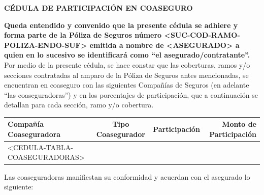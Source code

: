 ﻿\documentclass[letterpaper,10pt]{article}
\begin{document}
\begin{center}
    \textbf{CÉDULA DE PARTICIPACIÓN EN COASEGURO}
\end{center}

\textbf{Queda entendido y convenido que la presente cédula se adhiere y forma parte de la Póliza de Seguros número <SUC-COD-RAMO-POLIZA-ENDO-SUF> emitida a nombre de <ASEGURADO> a quien en lo sucesivo se identificará como ``el asegurado/contratante''.}\\

Por medio de la presente cédula, se hace constar que las coberturas, ramos y/o secciones contratadas al amparo de la Póliza de Seguros antes mencionadas, se encuentran en coaseguro con las siguientes Compañías de Seguros (en adelante ``las coaseguradoras'') y en los porcentajes de participación, que a continuación se detallan para cada sección, ramo y/o cobertura.

\begin{center}
    \begin{tabularx}{\textwidth}{|X|c|c|r|}
        \hline
        \textbf{Compañía Coaseguradora} & \textbf{Tipo Coasegurador} & \textbf{Participación} & \textbf{Monto de Participación}\\\hline
        <CEDULA-TABLA-COASEGURADORAS>
    \end{tabularx}
\end{center}

Las coaseguradoras manifiestan su conformidad y acuerdan con el asegurado lo siguiente:
\end{document}
